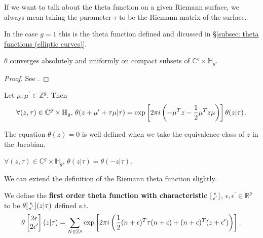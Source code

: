 \documentclass{article}
\begin{document}
\begin{remark}
	If we want to talk about the theta function on a given Riemann surface, we always mean taking the parameter $\tau$ to be the Riemann matrix of the surface. 
\end{remark}

\begin{remark}
	In the case $g=1$ this is the theta function defined and dicussed in \S \ref{subsec: theta functions (elliptic curves)}.
\end{remark}

\begin{prop}
	$\theta$ converges absolutely and uniformly on compact subsets of $\mathbb{C}^g \times \mathbb{H}_g$.
\end{prop}
\begin{proof}
	See \cite{Farkas1992}. 
\end{proof}

\begin{prop}[Periodicity]
	Let $\mu,\mu^\prime \in \mathbb{Z}^g$. Then 
	\[
	\forall (z,\tau) \in \mathbb{C}^g \times \mathbb{H}_g, \, \theta(z+\mu^\prime+ \tau\mu | \tau) = \exp\left[ 2\pi i \left( -\mu^T z - \frac{1}{2} \mu^T z \mu \right) \right]\theta(z | \tau) \, .
	\]
\end{prop}

\begin{corollary}
	The equation $\theta(z)=0$ is well defined when we take the equivalence class of $z$ in the Jacobian. 
\end{corollary}

\begin{prop}
	$\forall (z,\tau) \in \mathbb{C}^g \times \mathbb{H}_g, \, \theta(z|\tau) = \theta(-z | \tau)$. 
\end{prop}

We can extend the definition of the Riemann theta function slightly. 

\begin{definition}
We define the \textbf{first order theta function with characteristic} $\begin{bsmallmatrix} \epsilon \\ \epsilon^\prime \end{bsmallmatrix}$, $\epsilon, \epsilon^\prime \in \mathbb{R}^g$ to be $\theta\begin{bsmallmatrix} \epsilon \\ \epsilon^\prime \end{bsmallmatrix}(z | \tau)$ defined s.t. 
\[
	\theta\begin{bmatrix} 2\epsilon \\ 2\epsilon^\prime \end{bmatrix}(z|\tau) = \sum_{N \in \mathbb{Z}^g} \exp \left[ 2\pi i \left( \frac{1}{2} (n+\epsilon)^T \tau (n+\epsilon) + (n+\epsilon)^T(z+\epsilon^\prime) \right) \right] \, .
\]
\end{definition}
\end{document}
